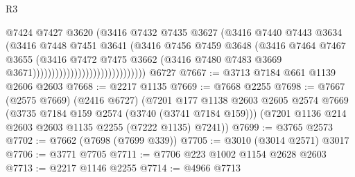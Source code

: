 \begin{lexlean}{R3}
\begin{coremodule}
                                                  @7424
                                                  @7427
                                                  @3620
                                                  (@3416
                                                    @7432
                                                    @7435
                                                    @3627
                                                    (@3416
                                                      @7440
                                                      @7443
                                                      @3634
                                                      (@3416
                                                        @7448
                                                        @7451
                                                        @3641
                                                        (@3416
                                                          @7456
                                                          @7459
                                                          @3648
                                                          (@3416
                                                            @7464
                                                            @7467
                                                            @3655
                                                            (@3416
                                                              @7472
                                                              @7475
                                                              @3662
                                                              (@3416
                                                                @7480
                                                                @7483
                                                                @3669
                                                                @3671))))))))))))))))))))))))))))))
    @6727
@7667 := @3713 @7184 @661 @1139 @2606 @2603
@7668 := @2217 @1135
@7669 := @7668 @2255
@7698 := @7667
    (@2575 @7669)
    (@2416 @6727)
    (@7201
      @177
      @1138
      @2603
      @2605
      @2574
      @7669
      (@3735 @7184 @159 @2574 (@3740 (@3741 @7184 @159)))
      (@7201 @1136 @214 @2603 @2603 @1135 @2255 (@7222 @1135) @7241))
@7699 := @3765 @2573
@7702 := @7662 (@7698 (@7699 @339))
@7705 := @3010 (@3014 @2571) @3017
@7706 := @3771 @7705
@7711 := @7706 @223 @1002 @1154 @2628 @2603
@7713 := @2217 @1146 @2255
@7714 := @4966 @7713

\end{coremodule}
\end{lexlean}
